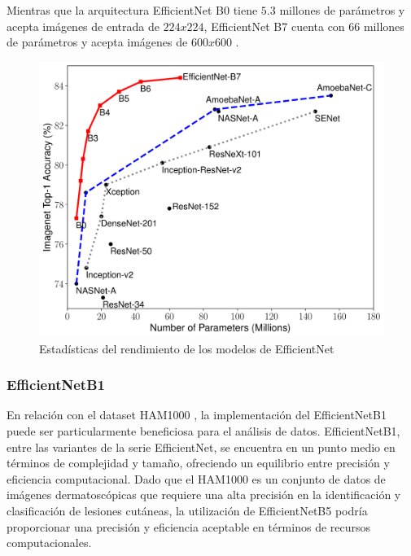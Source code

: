    Mientras que la arquitectura EfficientNet B0 tiene $5.3$ millones de parámetros y acepta imágenes de entrada de $224x224$, EfficientNet B7 cuenta con $66$ millones de parámetros y acepta imágenes de $600x600$ .
   
   \begin{figure}[ht]%
      \begin{center}
      \includegraphics[width=1\textwidth]{./Graphics/efficientnet_performance.png}
      \caption{Estadísticas del rendimiento de los modelos de EfficientNet}
      \label{fig:efficientnet_performance}
      \end{center}
      \end{figure}
   
\subsubsection{EfficientNetB1}
   
   En relación con el dataset HAM1000 , la implementación del EfficientNetB1 puede ser particularmente beneficiosa para el análisis de datos. EfficientNetB1, entre las variantes de la serie EfficientNet, se encuentra en un punto medio en términos de complejidad y tamaño, ofreciendo un equilibrio entre precisión y eficiencia computacional. Dado que el HAM1000 es un conjunto de datos de imágenes dermatoscópicas que requiere una alta precisión en la identificación y clasificación de lesiones cutáneas, la utilización de EfficientNetB5 podría proporcionar una precisión y eficiencia aceptable en términos de recursos computacionales.

